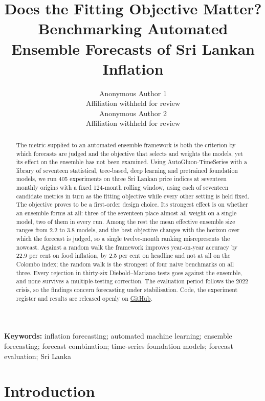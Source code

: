 \documentclass[12pt]{article}
\title{\textbf{
Does the Fitting Objective Matter? Benchmarking Automated
Ensemble Forecasts of Sri Lankan Inflation
}}
\author{
Anonymous Author 1\\
Affiliation withheld for review\\[1ex]
Anonymous Author 2\\
Affiliation withheld for review
}
\date{}
\newcommand{\repobase}{https://github.com/madarasw/Automated_Ensemble_Forecasting_for_Inflation_Sri_Lanka}
\newcommand{\repolink}[1]{\href{\repobase}{#1}}
\begin{document}
\maketitle

\begin{abstract}
The metric supplied to an automated ensemble framework is both the criterion by
which forecasts are judged and the objective that selects and weights the
models, yet its effect on the ensemble has not been examined. Using
AutoGluon-TimeSeries with a library of seventeen statistical, tree-based, deep
learning and pretrained foundation models, we run 405 experiments on three Sri
Lankan price indices at seventeen monthly origins with a fixed 124-month
rolling window, using each of seventeen candidate metrics in turn as the
fitting objective while every other setting is held fixed. The objective proves
to be a first-order design choice. Its strongest effect is on whether an
ensemble forms at all: three of the seventeen place almost all weight on a
single model, two of them in every run. Among the rest the mean effective
ensemble size ranges from 2.2 to 3.8 models, and the best objective changes
with the horizon over which the forecast is judged, so a single twelve-month
ranking misrepresents the nowcast. Against a random walk the framework improves
year-on-year accuracy by 22.9 per cent on food inflation, by 2.5 per cent on
headline and not at all on the Colombo index; the random walk is the strongest
of four naive benchmarks on all three. Every rejection in thirty-six
Diebold--Mariano tests goes against the ensemble, and none survives a
multiple-testing correction. The evaluation period follows the 2022 crisis, so
the findings concern forecasting under stabilisation. Code, the experiment
register and results are released openly on \repolink{GitHub}.
\end{abstract}

\noindent\textbf{Keywords:} inflation forecasting; automated machine learning;
ensemble forecasting; forecast combination; time-series foundation models;
forecast evaluation; Sri Lanka

\section{Introduction}
\label{sec:introduction}
\end{document}
